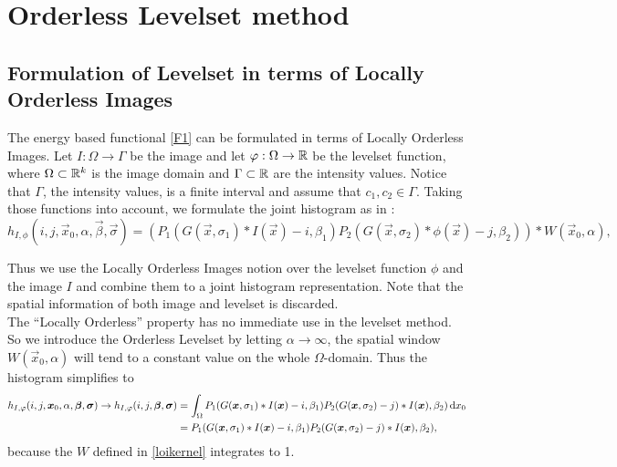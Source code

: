 
\chapter{Orderless Levelset method}\label{chapter:OL}
\section{Formulation of Levelset in terms of Locally Orderless Images}\label{section:OLform}
The energy based functional \eqref{F1} can be formulated in terms of Locally Orderless Images. Let $I:\Omega\to \Gamma$ be the image and let $\varphi:\Omega\to\mathbb R$ be the levelset function, where $\Omega\subset \mathbb R^k$ is the image domain and $\Gamma\subset\mathbb R$ are the intensity values. Notice that $\Gamma$, the intensity values, is a finite interval and assume that $c_1,c_2\in \Gamma$. Taking those functions into account, we formulate the joint histogram as in \cite{dar.11}:
\begin{equation}
  h_{I,\phi}(i,j,\vec{x}_0,\alpha,\vec{\beta},\vec{\sigma}) = (P_1(G(\vec{x},\sigma_1)*I(\vec{x})-i,\beta_1)P_2(G(\vec{x},\sigma_2)*\phi(\vec{x})-j,\beta_2))*W(\vec{x}_0,\alpha),
\end{equation}

Thus we use the Locally Orderless Images notion over the levelset function $\phi$ and the image $I$ and combine them to a joint histogram representation. Note that the spatial information of both image and levelset is discarded.\\
The ``Locally Orderless'' property has no immediate use in the levelset method. So we introduce the Orderless Levelset by letting $\alpha\to \infty$, the spatial window $W(\vec{x}_0,\alpha)$ will tend to a constant value on the whole $\Omega$-domain. Thus the histogram simplifies to
\begin{equation}
  \begin{split}
    h_{I,\varphi}(i,j,\boldsymbol{x} _0,\alpha,\boldsymbol{\beta} ,\boldsymbol{\sigma} )\to h_{I,\varphi}(i,j,\boldsymbol{\beta} ,\boldsymbol{\sigma} ) &= \int _\Omega P_1(G(\boldsymbol{x} ,\sigma_1)*I(\boldsymbol{x} )-i,\beta_1)P_2(G(\boldsymbol{x} ,\sigma_2)-j)*I(\boldsymbol{x} ),\beta_2)\,{\rm d} x_0\\
    &= P_1(G(\boldsymbol{x} ,\sigma_1)*I(\boldsymbol{x} )-i,\beta_1)P_2(G(\boldsymbol{x} ,\sigma_2)-j)*I(\boldsymbol{x} ),\beta_2),
  \end{split}
\end{equation}
because the $W$ defined in \eqref{loikernel} integrates to 1.\\

